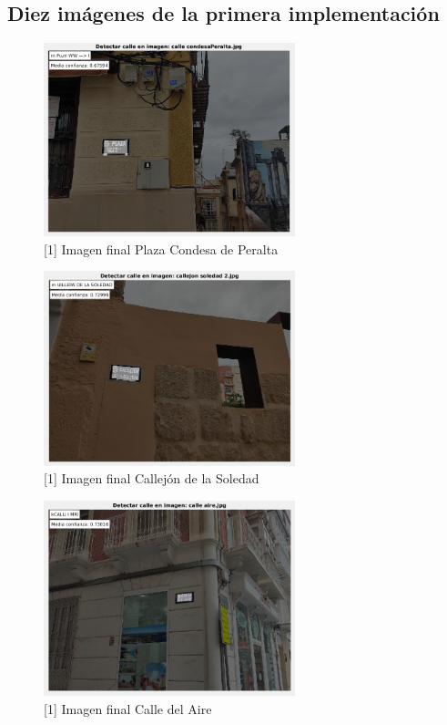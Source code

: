 \documentclass[12pt]{article}
\begin{document}
	\subsection{Diez imágenes de la primera implementación}
		\begin{figure}[h!]
			\begin{center}
				\includegraphics[width=0.65\textwidth]{img/1_1.png}
				\caption{[1] Imagen final Plaza Condesa de Peralta}
			\end{center}
		\end{figure}
	
		\begin{figure}[h!]
			\begin{center}
				\includegraphics[width=0.65\textwidth]{img/1_2.png}
				\caption{[1] Imagen final Callejón de la Soledad}
			\end{center}
		\end{figure}
	
		\pagebreak
		
		\begin{figure}[h!]
			\begin{center}
				\includegraphics[width=0.65\textwidth]{img/1_3.png}
				\caption{[1] Imagen final Calle del Aire}
			\end{center}
		\end{figure}
		
\end{document}
